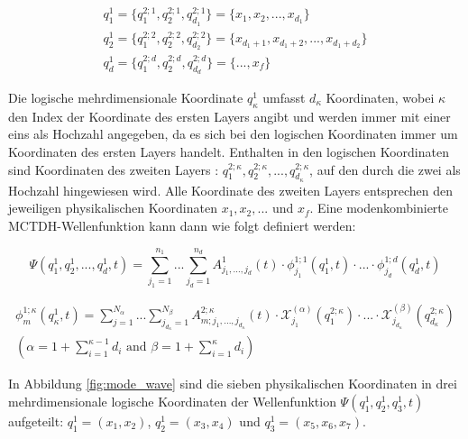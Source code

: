 \begin{equation}
\begin{gathered}
   q^{1}_{1} = \{q^{2;1}_{1},q^{2;1}_{2},q^{2;1}_{d_{1}}\} = \{x_{1}, x_{2}, ..., x_{d_1}\} \\
  q^{1}_{2} = \{q^{2;2}_{1},q^{2;2}_{2},q^{2;2}_{d_{2}}\} = \{x_{d_{1}+1}, x_{d_{1}+2}, ..., x_{d_{1}+d_{2}}\} \\
  q^{1}_{d} = \{q^{2;d}_{1},q^{2;d}_{2},q^{2;d}_{d_{d}}\} = \{..., x_{f}\}
\end{gathered}
\end{equation}

Die logische mehrdimensionale Koordinate $ q^1_\kappa $ umfasst $d_\kappa $ Koordinaten, wobei $\kappa$ den Index der Koordinate des ersten Layers angibt
und werden immer mit einer eins als Hochzahl angegeben, da es sich bei den logischen Koordinaten immer um Koordinaten des ersten Layers handelt.
Enthalten in den logischen Koordinaten sind Koordinaten des zweiten Layers : $  q^{2;\kappa}_1, q^{2;\kappa}_2, ..., q^{2;\kappa}_{d_\kappa} $, auf den durch die
zwei als Hochzahl hingewiesen wird. Alle Koordinate des zweiten Layers entsprechen den jeweiligen physikalischen Koordinaten $x_{1}, x_{2}, ...$ und $x_{f}$.
Eine modenkombinierte MCTDH-Wellenfunktion kann dann wie folgt definiert werden:

\begin{equation}
 \Psi(q^{1}_{1},q^{1}_{2},..., q^{1}_{d}, t)=\sum^{n_{1}}_{j_{1}=1} ... \sum^{n_{d}}_{j_{d}=1} A^{1}_{j_{1}, ..., j_{d}}(t)
 \cdot \phi^{1;1}_{j_{1}}(q^1_{1}, t) \cdot ... \cdot \phi^{1;d}_{j_{d}}(q^1_{d}, t)
 \label{Eq:mode_comb_wave}
 \end{equation}

\begin{equation}
  \begin{gathered}
 \phi^{1;\kappa}_{m} (q^1_{\kappa}, t)=\sum^{N_{\alpha}}_{j=1} ... \sum^{N_{\beta}}_{j_{d_\kappa}=1} A^{2;\kappa}_{m;j_1,...,j_{d_\kappa}}(t)
 \cdot \mathcal{X}^{(\alpha)}_{j_1}(q^{2;\kappa}_1) \cdot ... \cdot
 \mathcal{X}^{(\beta)}_{j_{d_\kappa}}(q^{2;\kappa}_{d_\kappa})\\
 \left( \alpha = 1 + \sum^{\kappa - 1}_{i=1}d_i \text{ and }  \beta = 1 + \sum^{\kappa}_{i=1}d_i\right)
 \label{Eq:mode_SPF}
\end{gathered}
 \end{equation}

In Abbildung \ref{fig:mode_wave} sind die sieben physikalischen
Koordinaten in drei mehrdimensionale logische Koordinaten der Wellenfunktion $ \Psi(q^{1}_{1},q^{1}_{2},q^{1}_{3}, t)$ aufgeteilt: $q^{1}_{1} = \left(x_1, x_2 \right)$, $ q^{1}_{2} = \left(x_3, x_4 \right)$
und $ q^{1}_{3} = \left(x_5, x_6, x_7 \right)$.


